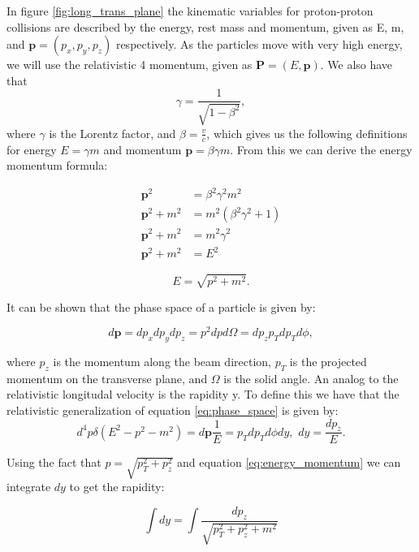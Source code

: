In figure \ref{fig:long_trans_plane} the kinematic variables for proton-proton collisions are described by the energy, rest mass 
and momentum, given as E, m, and $\textbf{p} = (p_x, p_y, p_z)$ respectively. As the particles move with very high energy, we will 
use the relativistic 4 momentum, given as $\textbf{P} = (E, \textbf{p})$. We also have that 
\begin{equation*}
    \gamma = \frac{1}{\sqrt{1-\beta^2}},
\end{equation*}
where $\gamma$ is the Lorentz factor, and $\beta = \frac{v}{c}$, which gives us the following definitions for energy $E = \gamma m$ and momentum $\textbf{p} = \beta\gamma m$\cite{Gramstad:1631043}. 
From this we can derive the energy momentum formula:

\begin{align*} 
    \textbf{p}^2 &= \beta^2\gamma^2m^2  \\ 
    \textbf{p}^2 + m^2 &=  m^2(\beta^2\gamma^2 + 1) \\
    \textbf{p}^2 + m^2 &= m^2\gamma^2 \\
    \textbf{p}^2 + m^2 &= E^2
\end{align*}

\begin{equation}\label{eq:energy_momentum}
    E = \sqrt{p^2 + m^2}.
\end{equation}

It can be shown that the phase space of a particle is given by\cite{green_highpt}:

\begin{equation}\label{eq:phase_space}
    d\textbf{p} = dp_xdp_ydp_z = p^2dpd\Omega = dp_zp_Tdp_Td\phi,
\end{equation}

where $p_z$ is the momentum along the beam direction, $p_T$ is the projected momentum on the transverse plane, 
and $\Omega$ is the solid angle. An analog to the relativistic longitudal velocity is the rapidity y. To define this 
we have that the relativistic generalization of equation \ref{eq:phase_space} is given by:
\begin{equation*}
    d^4p\delta (E^2 - p^2 - m^2) = d\textbf{p}\frac{1}{E} = p_T dp_Td\phi dy, \, \, dy = \frac{dp_z}{E}.
\end{equation*}

Using the fact that $p = \sqrt{p_T^2 + p_z^2}$ and equation \ref{eq:energy_momentum} we can integrate $dy$ to get the rapidity:

\begin{equation*}
    \int dy = \int \frac{dp_z}{\sqrt{p_T^2 + p_z^2 + m^2}}
\end{equation*}

